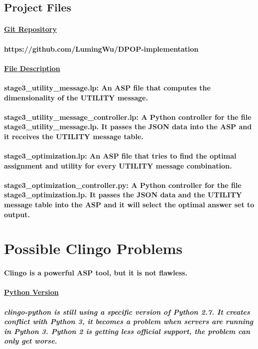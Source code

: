 \documentclass{article}
\begin{document}
	\subsection{Project Files}
	\paragraph{\underline{Git Repository}}
	\paragraph{https://github.com/LumingWu/DPOP-implementation}
	\paragraph{\underline{File Description}}
	\paragraph{stage3\_utility\_message.lp: An ASP file that computes the dimensionality of the UTILITY message.}
	\paragraph{stage3\_utility\_message\_controller.lp: A Python controller for the file stage3\_utility\_message.lp. It passes the JSON data into the ASP and it receives the UTILITY message table.}
	\paragraph{stage3\_optimization.lp: An ASP file that tries to find the optimal assignment and utility for every UTILITY message combination.}
	\paragraph{stage3\_optimization\_controller.py: A Python controller for the file stage3\_optimization.lp. It passes the JSON data and the UTILITY message table into the ASP and it will select the optimal answer set to output.}
	\section{Possible Clingo Problems}
	\paragraph{Clingo is a powerful ASP tool, but it is not flawless.}
	\paragraph{\underline{Python Version}}
	\subparagraph{clingo-python is still using a specific version of Python 2.7. It creates conflict with Python 3, it becomes a problem when servers are running in Python 3. Python 2 is getting less official support, the problem can only get worse.}
\end{document}
